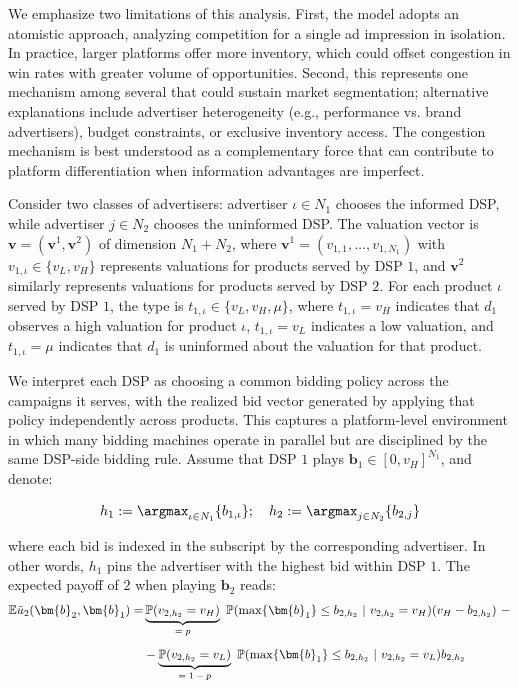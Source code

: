 \noindent We emphasize two limitations of this analysis. First, the model adopts an atomistic approach, analyzing competition for a single ad impression in isolation. In practice, larger platforms offer more inventory, which could offset congestion in win rates with greater volume of opportunities. Second, this represents one mechanism among several that could sustain market segmentation; alternative explanations include advertiser heterogeneity (e.g., performance vs. brand advertisers), budget constraints, or exclusive inventory access. The congestion mechanism is best understood as a complementary force that can contribute to platform differentiation when information advantages are imperfect.

\noindent Consider two classes of advertisers: advertiser $\iota \in N_1$ chooses the informed DSP, while advertiser $j \in N_2$ chooses the uninformed DSP. The valuation vector is $\bm{v} = (\bm{v}^1, \bm{v}^2)$ of dimension $N_1 + N_2$, where $\bm{v}^1 = (v_{1,1}, \ldots, v_{1,N_1})$ with $v_{1,\iota} \in \{v_L, v_H\}$ represents valuations for products served by DSP $1$, and $\bm{v}^2$ similarly represents valuations for products served by DSP $2$. For each product $\iota$ served by DSP $1$, the type is $t_{1,\iota} \in \{v_L, v_H, \mu\}$, where $t_{1,\iota} = v_H$ indicates that $d_1$ observes a high valuation for product $\iota$, $t_{1,\iota} = v_L$ indicates a low valuation, and $t_{1,\iota} = \mu$ indicates that $d_1$ is uninformed about the valuation for that product. \par

\noindent We interpret each DSP as choosing a common bidding policy across the campaigns it serves, with the realized bid vector generated by applying that policy independently across products. This captures a platform-level environment in which many bidding machines operate in parallel but are disciplined by the same DSP-side bidding rule. Assume that DSP $1$ plays $ \bm{b}_1 \in [0,v_H]^{N_1} $, and denote:

\begin{equation*}
h_1 := \argmax_{\substack{\iota \in N_1}} \{ b_{1, \iota }\}; \quad h_2 := \argmax_{\substack{j \in N_2}} \{ b_{2, j} \}
\end{equation*}

\noindent where each bid is indexed in the subscript by the corresponding advertiser. In other words, $h_1$ pins the advertiser with the highest bid within DSP $1$. The expected payoff of $ 2 $ when playing $ \bm{b}_2$ reads:
\begin{align*}
\mathbb{E} \tilde{u}_2 (\bm{b}_2, \bm{b}_1) = & \underbrace{\mathbb{P}(v_{2,h_2} = v_H)}_\text{$ = p $} \ \mathbb{P}(\max \{ \bm{b}_1 \} \leq b_{2, h_2} \ | \ v_{2,h_2} = v_H) (v_H - b_{2, h_2}) \ - \\[5pt]
&- \underbrace{\mathbb{P}(v_{2,h_2} = v_L)}_\text{$ = 1 - p $} \ \mathbb{P}(\max \{ \bm{b}_1 \} \leq b_{2, h_2} \ | \ v_{2,h_2}  = v_L) b_{2, h_2}
\end{align*}

